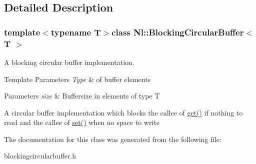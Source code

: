 \subsection{Detailed Description}
\subsubsection*{template$<$typename T$>$class Nl\-::\-Blocking\-Circular\-Buffer$<$ T $>$}

A blocking circular buffer implementation. 


\begin{DoxyTemplParams}{Template Parameters}
{\em Type} & of buffer elements \\
\hline
\end{DoxyTemplParams}

\begin{DoxyParams}{Parameters}
{\em size} & Buffersize in elements of type T\\
\hline
\end{DoxyParams}
A circular buffer implementation which blocks the callee of \hyperlink{group__Audio_ga3923df13e2115ece2a5f4969a9b2f890}{get()} if nothing to read and the callee of \hyperlink{group__Audio_gab60ad480d2ebe4b2aa526d31d808be7a}{set()} when no space to write 

The documentation for this class was generated from the following file\-:\begin{DoxyCompactItemize}
\item 
blockingcircularbuffer.\-h\end{DoxyCompactItemize}
